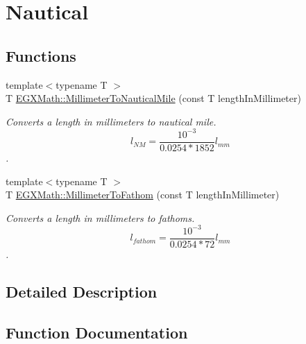 \hypertarget{group___e_g_x_math-_conversions-_length_conversions-_s_i-_millimeter-_nautical}{}\section{Nautical}
\label{group___e_g_x_math-_conversions-_length_conversions-_s_i-_millimeter-_nautical}
\subsection*{Functions}
\begin{DoxyCompactItemize}
\item 
{\footnotesize template$<$typename T $>$ }\\T \mbox{\hyperlink{group___e_g_x_math-_conversions-_length_conversions-_s_i-_millimeter-_nautical_ga05ed5fb1300287763d8927ee90315808}{E\+G\+X\+Math\+::\+Millimeter\+To\+Nautical\+Mile}} (const T length\+In\+Millimeter)
\begin{DoxyCompactList}\small\item\em Converts a length in millimeters to nautical mile. \[ l_{NM}= \frac{10^{-3}}{0.0254 * 1852} l_{mm} \]. \end{DoxyCompactList}\item 
{\footnotesize template$<$typename T $>$ }\\T \mbox{\hyperlink{group___e_g_x_math-_conversions-_length_conversions-_s_i-_millimeter-_nautical_ga1dce4ee3123e0132aae95bc9f7d0ac31}{E\+G\+X\+Math\+::\+Millimeter\+To\+Fathom}} (const T length\+In\+Millimeter)
\begin{DoxyCompactList}\small\item\em Converts a length in millimeters to fathoms. \[ l_{fathom}= \frac{10^{-3}}{0.0254 * 72} l_{mm} \]. \end{DoxyCompactList}\end{DoxyCompactItemize}


\subsection{Detailed Description}


\subsection{Function Documentation}
\mbox{\label{group___e_g_x_math-_conversions-_length_conversions-_s_i-_millimeter-_nautical_ga1dce4ee3123e0132aae95bc9f7d0ac31}} 

